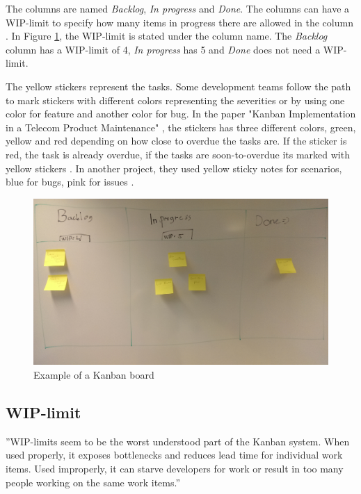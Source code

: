\documentclass[UKenglish]{ifimaster}  %
\begin{document}
The columns are named \textit{Backlog}, \textit{In progress} and \textit{Done}.  The columns can have a WIP-limit to specify how many items in progress there are allowed in the column \parencite{Joyce}. In Figure \ref{kanban_board}, the WIP-limit is stated under the column name. The \textit{Backlog} column has a WIP-limit of 4, \textit{In progress} has 5 and \textit{Done} does not need a WIP-limit. 

The yellow stickers represent the tasks. Some development teams follow the path to mark stickers with different colors representing the severities or by using one color for feature and another color for bug. In the paper "Kanban Implementation in a Telecom Product Maintenance" \parencite{6068363}, the stickers has three different colors, green, yellow and red depending on how close to overdue the tasks are. If the sticker is red, the task is already overdue, if the tasks are soon-to-overdue its marked with yellow stickers . In another project, they used yellow sticky notes for scenarios, blue for bugs, pink for issues \parencite{Shinkle}.
\begin{figure}[!htbp]
\centering
\includegraphics[width=\textwidth]{Picture/kanban_board.jpg}
\caption{Example of a Kanban board}
\label{kanban_board}
\end{figure}

\subsection{WIP-limit}
\label{WIPsec}
''WIP-limits seem to be the worst understood part of the Kanban system. When used properly, it exposes bottlenecks and reduces lead time for individual work items. Used improperly, it can starve developers for work or result in too many people working on the same work items.'' \parencite{Shinkle}
\end{document}
